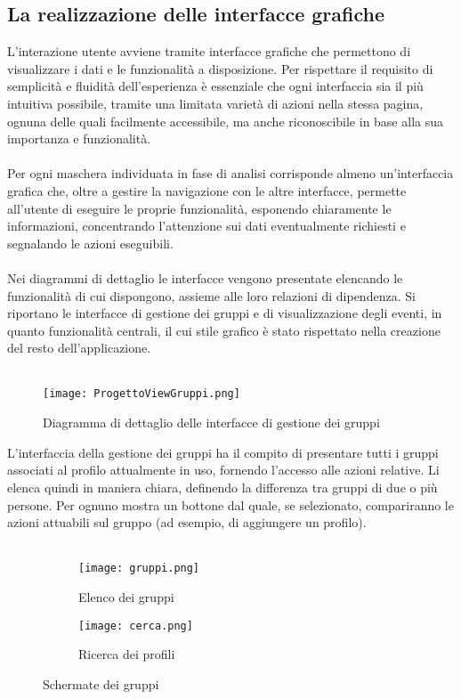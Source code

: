 \subsection{La realizzazione delle interfacce grafiche}
L'interazione utente avviene tramite interfacce grafiche 
che permettono di visualizzare i dati e le funzionalità a disposizione. 
Per rispettare il requisito di semplicità e fluidità dell'esperienza è essenziale che 
ogni interfaccia sia il più intuitiva possibile, tramite una limitata varietà di azioni nella stessa pagina,
ognuna delle quali facilmente accessibile, ma anche riconoscibile in base alla sua importanza e funzionalità.\\
\\
Per ogni maschera individuata in fase di analisi corrisponde almeno un'interfaccia grafica che, 
oltre a gestire la navigazione con le altre interfacce, 
permette all'utente di eseguire le proprie funzionalità,
esponendo chiaramente le informazioni,
concentrando l'attenzione sui dati eventualmente richiesti e segnalando le azioni eseguibili.\\
\\
Nei diagrammi di dettaglio le interfacce vengono presentate elencando le funzionalità di cui dispongono, 
assieme alle loro relazioni di dipendenza.
Si riportano le interfacce di gestione dei gruppi e di visualizzazione degli eventi, 
in quanto funzionalità centrali, il cui stile grafico è stato rispettato nella creazione del resto dell'applicazione.\\
\\
\begin{figure}[htbp]
    \begin{center}
        \texttt{[image: ProgettoViewGruppi.png]}
        \caption{Diagramma di dettaglio delle interfacce di gestione dei gruppi}
    \end{center}
\end{figure}

L'interfaccia della gestione dei gruppi ha il compito di presentare tutti i gruppi 
associati al profilo attualmente in uso,
fornendo l'accesso alle azioni relative. 
Li elenca quindi in maniera chiara, definendo la differenza tra gruppi di due o più persone.
Per ognuno mostra un bottone dal quale, se selezionato, compariranno le azioni attuabili sul gruppo 
(ad esempio, di aggiungere un profilo).\\
\\
\begin{figure}[htbp]
    \centering
    \begin{subfigure}{0.49\textwidth}
        \centering
        \texttt{[image: gruppi.png]}
        \caption{Elenco dei gruppi}
    \end{subfigure}
    \hfill
    \begin{subfigure}{0.49\textwidth}
        \centering
        \texttt{[image: cerca.png]}
        \caption{Ricerca dei profili}
    \end{subfigure}
    \caption{Schermate dei gruppi}
\end{figure}

